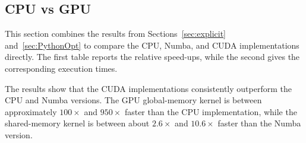 \documentclass[11pt]{report}
\begin{document}
\subsection{CPU vs GPU}
This section combines the results from 
Sections~\ref{sec:explicit} and~\ref{sec:PythonOpt} 
to compare the CPU, Numba, and CUDA implementations 
directly. The first table reports the relative 
speed-ups, while the second gives the corresponding 
execution times.

\begin{table}[H]
\centering
{}
\caption{Speed-up comparison between CPU, Numba, and CUDA explicit finite-difference implementations.}
\label{tab:explicit-speedups}
\end{table}

The results show that the CUDA 
implementations consistently outperform 
the CPU and Numba versions. The GPU 
global-memory kernel is between 
approximately $100\times$ and $950\times$ 
faster than the CPU implementation, while 
the shared-memory kernel is between about 
$2.6\times$ and $10.6\times$ faster than the 
Numba version.

\begin{table}[H]
\centering
{}
\caption{Execution-time comparison between CPU, Numba, and CUDA explicit finite-difference implementations.}
\label{tab:explicit-execution-times}
\end{table}
\end{document}

